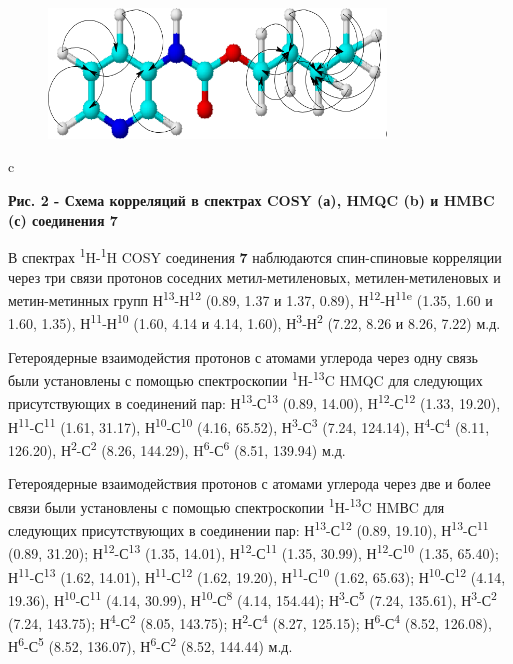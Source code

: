 \begin{figure}[H]
	\centering
	\includegraphics[width=0.8\textwidth]{assets/9}
	\caption*{}
\end{figure}c

{\bfseries Рис. 2 - Схема корреляций в спектрах COSY (а), HMQC (b) и HMBC
(с) соединения 7}

В спектрах \textsuperscript{1}H-\textsuperscript{1}H COSY соединения
{\bfseries 7} наблюдаются спин-спиновые корреляции через три связи протонов
соседних метил-метиленовых, метилен-метиленовых и метин-метинных групп
Н\textsuperscript{13}-Н\textsuperscript{12} (0.89, 1.37 и 1.37, 0.89),
Н\textsuperscript{12}-Н\textsuperscript{11e} (1.35, 1.60 и 1.60, 1.35),
Н\textsuperscript{11}-Н\textsuperscript{10} (1.60, 4.14 и 4.14, 1.60),
Н\textsuperscript{3}-Н\textsuperscript{2} (7.22, 8.26 и 8.26, 7.22) м.д.

Гетероядерные взаимодейстия протонов с атомами углерода через одну связь
были установлены с помощью спектроскопии
\textsuperscript{1}H-\textsuperscript{13}C HMQC для следующих
присутствующих в соединений пар:
Н\textsuperscript{13}-С\textsuperscript{13} (0.89, 14.00),
H\textsuperscript{12}-С\textsuperscript{12} (1.33, 19.20),
Н\textsuperscript{11}-С\textsuperscript{11} (1.61, 31.17),
Н\textsuperscript{10}-С\textsuperscript{10} (4.16, 65.52),
Н\textsuperscript{3}-С\textsuperscript{3} (7.24, 124.14),
H\textsuperscript{4}-С\textsuperscript{4} (8.11, 126.20),
Н\textsuperscript{2}-С\textsuperscript{2} (8.26, 144.29),
H\textsuperscript{6}-С\textsuperscript{6} (8.51, 139.94) м.д.

Гетероядерные взаимодействия протонов с атомами углерода через две и
более связи были установлены с помощью спектроскопии
\textsuperscript{1}H-\textsuperscript{13}C HMВC для следующих
присутствующих в соединении пар:
Н\textsuperscript{13}-С\textsuperscript{12} (0.89, 19.10),
Н\textsuperscript{13}-С\textsuperscript{11} (0.89, 31.20);
Н\textsuperscript{12}-С\textsuperscript{13} (1.35, 14.01),
Н\textsuperscript{12}-С\textsuperscript{11} (1.35, 30.99),
Н\textsuperscript{12}-С\textsuperscript{10} (1.35, 65.40);
Н\textsuperscript{11}-С\textsuperscript{13} (1.62, 14.01),
Н\textsuperscript{11}-С\textsuperscript{12} (1.62, 19.20),
Н\textsuperscript{11}-С\textsuperscript{10} (1.62, 65.63);
Н\textsuperscript{10}-С\textsuperscript{12} (4.14, 19.36),
Н\textsuperscript{10}-С\textsuperscript{11} (4.14, 30.99),
Н\textsuperscript{10}-С\textsuperscript{8} (4.14, 154.44);
Н\textsuperscript{3}-С\textsuperscript{5} (7.24, 135.61),
Н\textsuperscript{3}-С\textsuperscript{2} (7.24, 143.75);
Н\textsuperscript{4}-С\textsuperscript{2} (8.05, 143.75);
Н\textsuperscript{2}-С\textsuperscript{4} (8.27, 125.15);
Н\textsuperscript{6}-С\textsuperscript{4} (8.52, 126.08),
Н\textsuperscript{6}-С\textsuperscript{5} (8.52, 136.07),
Н\textsuperscript{6}-С\textsuperscript{2} (8.52, 144.44) м.д.

